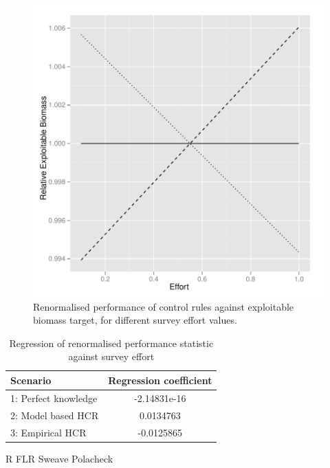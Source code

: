 \documentclass[a4paper]{article}
\begin{document}
\begin{figure}
\centering
\includegraphics{script-024}
\caption{Renormalised performance of control rules against exploitable biomass target, for different survey effort values.}
\label{fig:hcr_stoch_biomass_norm}
\end{figure}

\begin{table}
\centering
\begin{tabular}{lc}
\hline
Scenario & Regression coefficient\\
\hline
1: Perfect knowledge & -2.14831e-16\\
2: Model based HCR   & 0.0134763\\
3: Empirical HCR     & -0.0125865\\
\hline
\end{tabular}
\caption{Regression of renormalised performance statistic against survey effort}
\label{tab:res}
\end{table}



\newpage


R
FLR
Sweave
Polacheck
\end{document}
